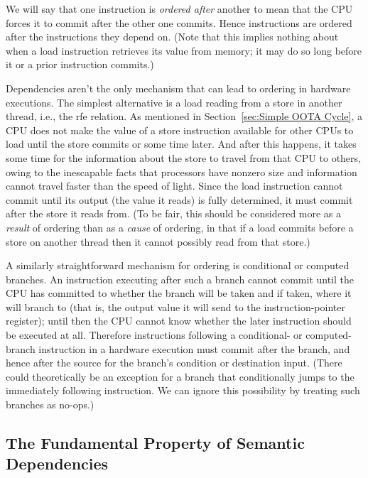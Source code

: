 \documentclass[10]{article}
\begin{document}
We will say that one instruction is \emph{ordered after} another to mean that
the CPU forces it to commit after the other one commits.
Hence instructions are ordered after the instructions they depend on.
(Note that this implies nothing about when a load instruction retrieves
its value from memory; it may do so long before it or a prior
instruction commits.)

Dependencies aren't the only mechanism that can lead to
ordering in hardware executions.
The simplest alternative is a load reading from a store in another
thread, i.e., the rfe relation.
As mentioned in Section~\ref{sec:Simple OOTA Cycle}, a CPU does
not make the value of a store instruction available for other CPUs to
load until the store commits or some time later.
And after this happens, it takes some time for the information about
the store to travel from that CPU to others, owing to the inescapable
facts that processors have nonzero size and information cannot travel
faster than the speed of light.
Since the load instruction cannot commit until its output (the value it
reads) is fully determined, it must commit after the store it reads
from.
(To be fair, this should be considered more as a \emph{result} of
ordering than as a \emph{cause} of ordering, in that
if a load commits before a store on another thread then it
cannot possibly read from that store.)

A similarly straightforward mechanism for ordering is conditional or
computed branches.
An instruction executing after such a branch cannot commit
until the CPU has committed to whether the branch will be taken and
if taken, where it will branch to (that is, the output value it will
send to the instruction-pointer register);
until then the CPU cannot know whether the later instruction should
be executed at all.
Therefore instructions following a conditional- or computed-branch
instruction in a hardware execution must commit after the branch, and hence
after the source for the branch's condition or destination input.
(There could theoretically be an exception for a branch that
conditionally jumps to the immediately following instruction.
We can ignore this possibility by treating such branches as no-ops.)

\subsection{The Fundamental Property of Semantic Dependencies}
\label{sec:The Fundamental Property of Semantic Dependencies}
\end{document}
